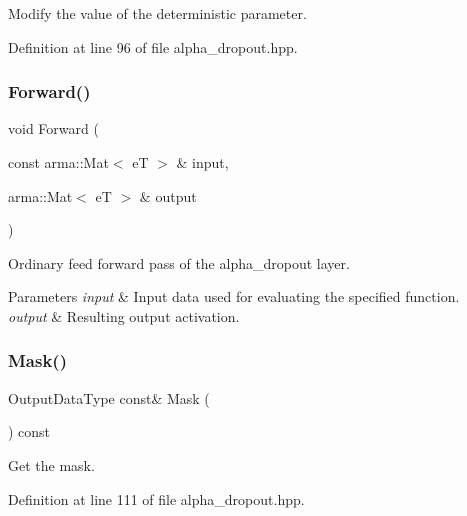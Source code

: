 Modify the value of the deterministic parameter. 



Definition at line 96 of file alpha\+\_\+dropout.\+hpp.

\mbox{\label{classmlpack_1_1ann_1_1AlphaDropout_a461f849bc638c15bec262dc9c3a58abe}} 
\subsubsection{Forward()}
{\footnotesize\ttfamily void Forward (\begin{DoxyParamCaption}\item[{const arma\+::\+Mat$<$ eT $>$ \&}]{input,  }\item[{arma\+::\+Mat$<$ eT $>$ \&}]{output }\end{DoxyParamCaption})}



Ordinary feed forward pass of the alpha\+\_\+dropout layer. 


\begin{DoxyParams}{Parameters}
{\em input} & Input data used for evaluating the specified function. \\
\hline
{\em output} & Resulting output activation. \\
\hline
\end{DoxyParams}
\mbox{\label{classmlpack_1_1ann_1_1AlphaDropout_a6503ae5d92f15edf34212579382fca27}} 
\subsubsection{Mask()}
{\footnotesize\ttfamily Output\+Data\+Type const\& Mask (\begin{DoxyParamCaption}{ }\end{DoxyParamCaption}) const\hspace{0.3cm}{\ttfamily [inline]}}



Get the mask. 



Definition at line 111 of file alpha\+\_\+dropout.\+hpp.

\mbox{\label{classmlpack_1_1ann_1_1AlphaDropout_a0ee21c2a36e5abad1e7a9d5dd00849f9}} 
